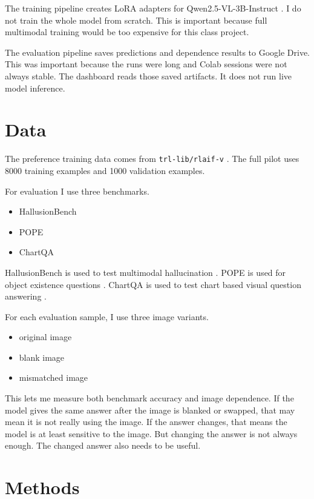 \documentclass{article}
\begin{document}
The training pipeline creates LoRA adapters for Qwen2.5-VL-3B-Instruct \cite{lora,qwen25vl}.
I do not train the whole model from scratch.
This is important because full multimodal training would be too expensive for this class project.

The evaluation pipeline saves predictions and dependence results to Google Drive.
This was important because the runs were long and Colab sessions were not always stable.
The dashboard reads those saved artifacts.
It does not run live model inference.

\section{Data}
The preference training data comes from \texttt{trl-lib/rlaif-v} \cite{rlaifv}.
The full pilot uses 8000 training examples and 1000 validation examples.

For evaluation I use three benchmarks.

\begin{itemize}
    \item HallusionBench
    \item POPE
    \item ChartQA
\end{itemize}

HallusionBench is used to test multimodal hallucination \cite{hallusionbench}.
POPE is used for object existence questions \cite{pope}.
ChartQA is used to test chart based visual question answering \cite{chartqa}.

For each evaluation sample, I use three image variants.

\begin{itemize}
    \item original image
    \item blank image
    \item mismatched image
\end{itemize}

This lets me measure both benchmark accuracy and image dependence.
If the model gives the same answer after the image is blanked or swapped, that may mean it is not really using the image.
If the answer changes, that means the model is at least sensitive to the image.
But changing the answer is not always enough.
The changed answer also needs to be useful.

\section{Methods}
\end{document}
